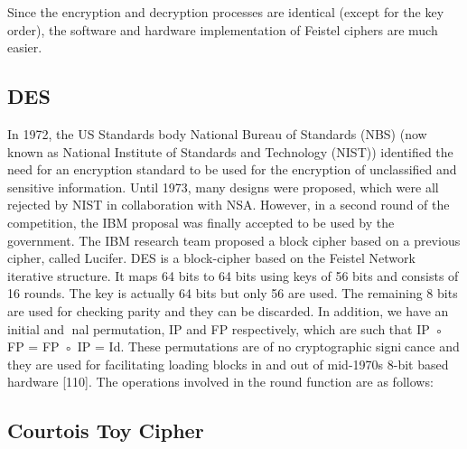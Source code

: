 Since the encryption and decryption processes are identical (except for the key order), the software and hardware implementation of Feistel ciphers are much easier.
\subsection{DES}
In 1972, the US Standards body National Bureau of Standards (NBS) (now known
as National Institute of Standards and Technology (NIST)) identified the need for
an encryption standard to be used for the encryption of unclassified and sensitive
information. Until 1973, many designs were proposed, which were all rejected by NIST
in collaboration with NSA. However, in a second round of the competition, the IBM
proposal was finally accepted to be used by the government. The IBM research team
proposed a block cipher based on a previous cipher, called Lucifer.
DES is a block-cipher based on the Feistel Network iterative structure. It maps 64
bits to 64 bits using keys of 56 bits and consists of 16 rounds. The key is actually 64
bits but only 56 are used. The remaining 8 bits are used for checking parity and they
can be discarded.
In addition, we have an initial and nal permutation, IP and FP respectively, which
are such that IP ◦ FP = FP ◦ IP = Id. These permutations are of no cryptographic
signicance and they are used for facilitating loading blocks in and out of mid-1970s
8-bit based hardware [110].
The operations involved in the round function are as follows: 
\subsection{Courtois Toy Cipher}
